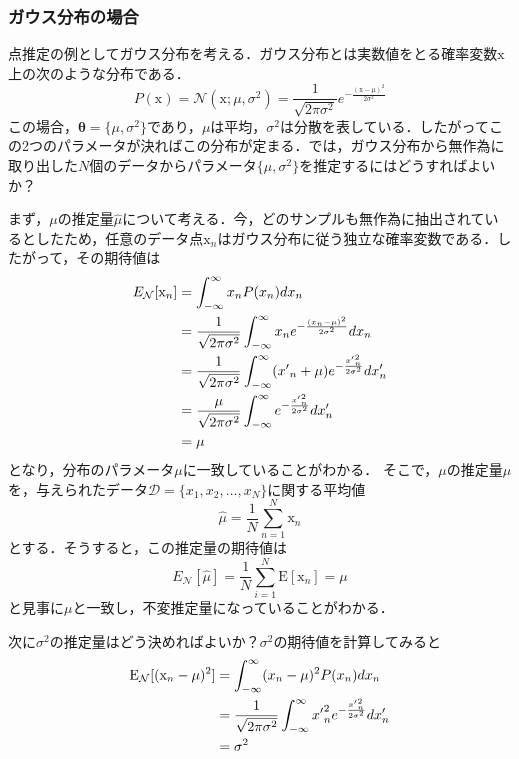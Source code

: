 \documentclass[a4paper,11pt]{jsreport}
\begin{document}
\subsubsection{ガウス分布の場合}
点推定の例としてガウス分布を考える．ガウス分布とは実数値をとる確率変数$\mathrm{x}$上の次のような分布である．
\begin{equation}
  P(\mathrm{x})
  = \mathcal{N}(\mathrm{x}; \mu, \sigma^2)
  = \frac{1}{\sqrt{2 \pi \sigma^2}} e^{-\frac{(\mathrm{x}-\mu)^2}{2\sigma^2}}
\end{equation}
この場合，$\bm{\theta} = \{ \mu, \sigma^2 \}$であり，$\mu$は平均，$\sigma^2$は分散を表している．したがってこの2つのパラメータが決ればこの分布が定まる．では，ガウス分布から無作為に取り出した$N$個のデータからパラメータ$\{ \mu, \sigma^2 \}$を推定するにはどうすればよいか？\par
まず，$\mu$の推定量$\hat{\mu}$について考える．今，どのサンプルも無作為に抽出されているとしたため，任意のデータ点$\mathrm{x}_n$はガウス分布に従う独立な確率変数である．したがって，その期待値は
\begin{align}
  E_{\mathcal{N}}[\mathrm{x}_n]
  &= \int_{-\infty}^{\infty} x_n P(x_n) dx_n \notag \\
  &= \frac{1}{\sqrt{2 \pi \sigma^2}} \int_{-\infty}^{\infty} x_n e^{-\frac{(x_n - \mu)^2}{2\sigma^2}} dx_n \notag \\
  &= \frac{1}{\sqrt{2 \pi \sigma^2}} \int_{-\infty}^{\infty} ({x'}_n + \mu) e^{-\frac{{x'}_n^2}{2\sigma^2}} dx'_n \notag \\
  &= \frac{\mu}{\sqrt{2 \pi \sigma^2}} \int_{-\infty}^{\infty} e^{-\frac{{x'}_n^2}{2\sigma^2}} dx'_n \notag \\
  &= \mu
\end{align}
となり，分布のパラメータ$\mu$に一致していることがわかる．
そこで，$\mu$の推定量$\hat{\mu}$を，与えられたデータ$\mathcal{D} = \{ x_1, x_2, \dots, x_N \}$に関する平均値
\begin{equation}
  \hat{\mu}
  = \frac{1}{N} \sum_{n=1}^{N} \mathrm{x}_n
\end{equation}
とする．そうすると，この推定量の期待値は
\begin{equation}
  E_{\mathcal{N}}[\hat{\mu}]
  = \frac{1}{N} \sum_{i=1}^N \mathrm{E}[\mathrm{x}_n] = \mu
\end{equation}
と見事に$\mu$と一致し，不変推定量になっていることがわかる．\par
次に$\sigma^2$の推定量はどう決めればよいか？$\sigma^2$の期待値を計算してみると
\begin{align}
  \mathrm{E}_{\mathcal{N}}[(\mathrm{x}_n - \mu)^2]
   & = \int_{-\infty}^{\infty} (x_n - \mu)^2 P(x_n) dx_n \notag \\
   & = \frac{1}{\sqrt{2 \pi \sigma^2}}\int_{-\infty}^{\infty} {x'}_n^2 e^{-\frac{{x'}_n^2}{2 \sigma^2}} dx'_n \notag \\
   & = \sigma^2
\end{align}
\end{document}
